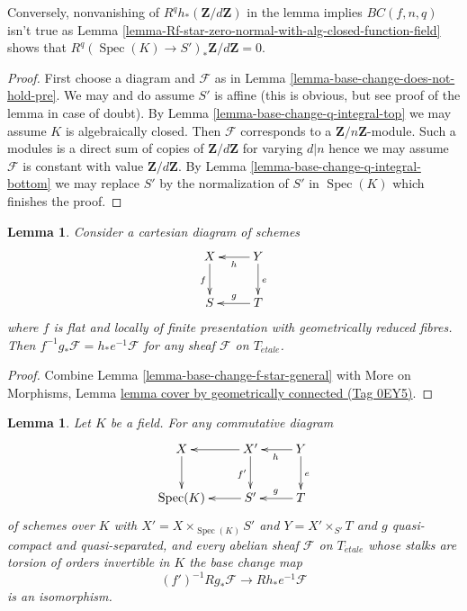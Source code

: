 \documentclass{amsart}
\theoremstyle{plain}
\newtheorem{lemma}[subsection]{Lemma}
\theoremstyle{definition}
\theoremstyle{remark}
\numberwithin{equation}{subsection}
\def\Spec{\mathop{\mathrm{Spec}}}
\def\etale{{\acute{e}tale}}
\begin{document}
\noindent
Conversely, nonvanishing of $R^qh_*(\mathbf{Z}/d\mathbf{Z})$
in the lemma implies $BC(f, n, q)$ isn't true as
Lemma \ref{lemma-Rf-star-zero-normal-with-alg-closed-function-field}
shows that $R^q(\Spec(K) \to S')_*\mathbf{Z}/d\mathbf{Z} = 0$.

\begin{proof}
First choose a diagram and $\mathcal{F}$ as in
Lemma \ref{lemma-base-change-does-not-hold-pre}.
We may and do assume $S'$ is affine (this is obvious, but
see proof of the lemma in case of doubt).
By Lemma \ref{lemma-base-change-q-integral-top}
we may assume $K$ is algebraically closed.
Then $\mathcal{F}$ corresponds to a $\mathbf{Z}/n\mathbf{Z}$-module.
Such a modules is a direct sum of copies of $\mathbf{Z}/d\mathbf{Z}$
for varying $d | n$ hence we may assume $\mathcal{F}$ is
constant with value $\mathbf{Z}/d\mathbf{Z}$.
By Lemma \ref{lemma-base-change-q-integral-bottom}
we may replace $S'$ by the normalization
of $S'$ in $\Spec(K)$ which finishes the proof.
\end{proof}






\begin{lemma}
\label{lemma-fppf-reduced-fibres-base-change-f-star}
Consider a cartesian diagram of schemes
$$
\xymatrix{
X \ar[d]_f & Y \ar[l]^h \ar[d]^e \\
S & T \ar[l]_g
}
$$
where $f$ is flat and locally of finite presentation
with geometrically reduced fibres.
Then $f^{-1}g_*\mathcal{F} = h_*e^{-1}\mathcal{F}$
for any sheaf $\mathcal{F}$ on $T_\etale$.
\end{lemma}

\begin{proof}
Combine Lemma \ref{lemma-base-change-f-star-general} with
More on Morphisms, Lemma
\href{https://stacks.math.columbia.edu/tag/0EY5}{lemma cover by geometrically connected (Tag 0EY5)}.
\end{proof}


\begin{lemma}
\label{lemma-punctual-base-change}
Let $K$ be a field. For any commutative diagram
$$
\xymatrix{
X \ar[d] & X' \ar[l] \ar[d]_{f'} & Y \ar[l]^h \ar[d]^e \\
\Spec(K) & S' \ar[l] & T \ar[l]_g
}
$$
of schemes over $K$ with
$X' = X \times_{\Spec(K)} S'$ and $Y = X' \times_{S'} T$ and
$g$ quasi-compact and quasi-separated, and every abelian sheaf
$\mathcal{F}$ on $T_\etale$ whose stalks are torsion of orders
invertible in $K$ the base change map
$$
(f')^{-1}Rg_*\mathcal{F}
\longrightarrow
Rh_*e^{-1}\mathcal{F}
$$
is an isomorphism.
\end{lemma}
\end{document}
